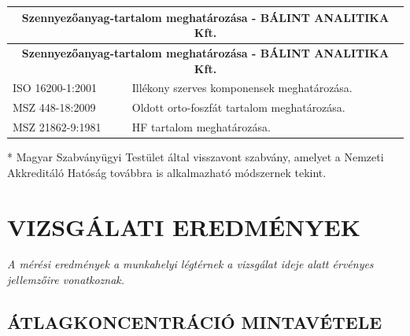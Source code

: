\documentclass[a4paper,12pt]{article}
\begin{document}
		\begin{longtable}{|p{5cm}|p{10cm}|}
			\hline
			\multicolumn{2}{|c|}{\textbf{Szennyezőanyag-tartalom meghatározása - BÁLINT ANALITIKA Kft.}} \\
			\hline
			\endfirsthead

			\hline
			\multicolumn{2}{|c|}{\textbf{Szennyezőanyag-tartalom meghatározása - BÁLINT ANALITIKA Kft.}} \\
			\hline
			\endhead

			\endfoot

			\hline
			\endlastfoot

			ISO 16200-1:2001 & Illékony szerves komponensek meghatározása. \\ \hline MSZ 448-18:2009 & Oldott orto-foszfát tartalom meghatározása. \\ \hline MSZ 21862-9:1981 & HF tartalom meghatározása. \\ \hline 

		\end{longtable}


		\parbox{\textwidth}{\raggedright \footnotesize
			* Magyar Szabványügyi Testület által visszavont szabvány, amelyet a Nemzeti Akkreditáló Hatóság továbbra is alkalmazható módszernek tekint.
		}


	\newpage
	\section{VIZSGÁLATI EREDMÉNYEK}
		\begin{adjustwidth}{1cm}{0cm}
			\textit{A mérési eredmények a munkahelyi légtérnek a vizsgálat ideje alatt érvényes jellemzőire vonatkoznak.}
		\end{adjustwidth}

	\subsection{ÁTLAGKONCENTRÁCIÓ MINTAVÉTELE}
	
\end{document}
